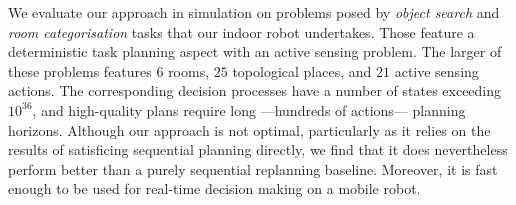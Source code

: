 
We evaluate our approach in simulation on problems posed by {\em
object search} and {\em room categorisation} tasks that our indoor
robot undertakes. Those feature a deterministic task planning aspect
with an active sensing problem. The larger of these problems features
$6$ rooms, $25$ topological places, and $21$ active sensing
actions. The corresponding decision processes have a number of states
exceeding $10^{36}$, and high-quality plans require long ---hundreds
of actions--- planning horizons.
Although our approach is not optimal, particularly as it relies on the
results of satisficing sequential planning directly, we find that it
does nevertheless perform better than a purely sequential replanning
baseline. Moreover, it is fast enough to be used for real-time
decision making on a mobile robot.





